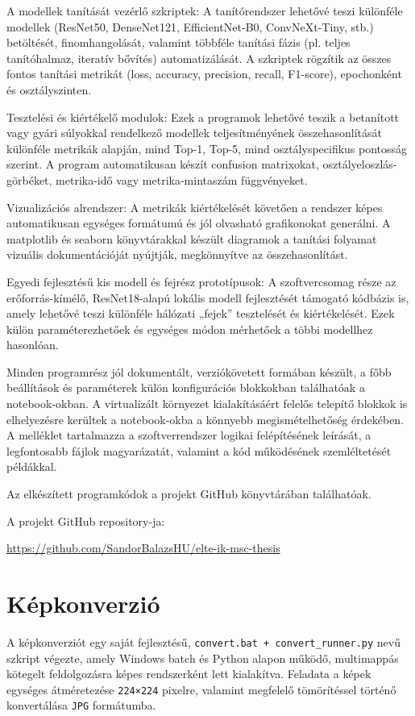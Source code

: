 \documentclass[	
  noindent
]{elteikthesis}[2024/04/26]
\begin{document}
        A modellek tanítását vezérlő szkriptek: A tanítórendszer lehetővé teszi különféle modellek (ResNet50, DenseNet121, EfficientNet-B0, ConvNeXt-Tiny, stb.) betöltését, finomhangolását, valamint többféle tanítási fázis (pl. teljes tanítóhalmaz, iteratív bővítés) automatizálását. A szkriptek rögzítik az összes fontos tanítási metrikát (loss, accuracy, precision, recall, F1-score), epochonként és osztályszinten.

        Tesztelési és kiértékelő modulok: Ezek a programok lehetővé teszik a betanított vagy gyári súlyokkal rendelkező modellek teljesítményének összehasonlítását különféle metrikák alapján, mind Top-1, Top-5, mind osztályspecifikus pontosság szerint. A program automatikusan készít confusion matrixokat, osztályeloszlás-görbéket, metrika-idő vagy metrika-mintaszám függvényeket.

        Vizualizációs alrendszer: A metrikák kiértékelését követően a rendszer képes automatikusan egységes formátumú és jól olvasható grafikonokat generálni. A matplotlib és seaborn könyvtárakkal készült diagramok a tanítási folyamat vizuális dokumentációját nyújtják, megkönnyítve az összehasonlítást.

        Egyedi fejlesztésű kis modell és fejrész prototípusok: A szoftvercsomag része az erőforrás-kímélő, ResNet18-alapú lokális modell fejlesztését támogató kódbázis is, amely lehetővé teszi különféle hálózati „fejek” tesztelését és kiértékelését. Ezek külön paraméterezhetőek és egységes módon mérhetőek a többi modellhez hasonlóan.

    Minden programrész jól dokumentált, verziókövetett formában készült, a főbb beállítások és paraméterek külön konfigurációs blokkokban találhatóak a notebook-okban. A virtualizált környezet kialakításáért felelős telepítő blokkok is elhelyezésre kerültek a notebook-okba a könnyebb megismételhetőség érdekében. A melléklet tartalmazza a szoftverrendszer logikai felépítésének leírását, a legfontosabb fájlok magyarázatát, valamint a kód működésének szemléltetését példákkal.

    Az elkészített programkódok a projekt GitHub könyvtárában találhatóak. 

    A projekt GitHub repository-ja:

    \url{https://github.com/SandorBalazsHU/elte-ik-msc-thesis}

    \section{Képkonverzió}
      A képkonverziót egy saját fejlesztésű, \texttt{convert.bat + convert\_runner.py} nevű szkript végezte, amely Windows batch és Python alapon működő, multimappás kötegelt feldolgozásra képes rendszerként lett kialakítva. Feladata a képek egységes átméretezése \texttt{224×224} pixelre, valamint megfelelő tömörítéssel történő konvertálása \texttt{JPG} formátumba.
      
\end{document}

